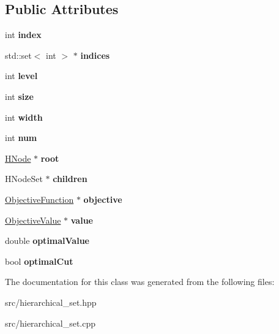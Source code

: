 \subsection*{Public Attributes}
\begin{DoxyCompactItemize}
\item 
\hypertarget{classHNode_a5e2c6cb9918a764753952cdd28617570}{int {\bfseries index}}\label{classHNode_a5e2c6cb9918a764753952cdd28617570}

\item 
\hypertarget{classHNode_a2dc355d3d7502bb90e8682bd81087575}{std\-::set$<$ int $>$ $\ast$ {\bfseries indices}}\label{classHNode_a2dc355d3d7502bb90e8682bd81087575}

\item 
\hypertarget{classHNode_adcc11fe69c64eeb77f920b98e404d9e9}{int {\bfseries level}}\label{classHNode_adcc11fe69c64eeb77f920b98e404d9e9}

\item 
\hypertarget{classHNode_a647c6437fde5eccdfab4879b7c485707}{int {\bfseries size}}\label{classHNode_a647c6437fde5eccdfab4879b7c485707}

\item 
\hypertarget{classHNode_a5bdb5568025a03c7f96cf638821f655d}{int {\bfseries width}}\label{classHNode_a5bdb5568025a03c7f96cf638821f655d}

\item 
\hypertarget{classHNode_a80af2cfac18d728df6f581385fafbb2e}{int {\bfseries num}}\label{classHNode_a80af2cfac18d728df6f581385fafbb2e}

\item 
\hypertarget{classHNode_ad1fc63b85babb8d83f3be87468210e32}{\hyperlink{classHNode}{H\-Node} $\ast$ {\bfseries root}}\label{classHNode_ad1fc63b85babb8d83f3be87468210e32}

\item 
\hypertarget{classHNode_a9138b7f3a2168c03aebc5893364c576f}{H\-Node\-Set $\ast$ {\bfseries children}}\label{classHNode_a9138b7f3a2168c03aebc5893364c576f}

\item 
\hypertarget{classHNode_a7e4827e4c414093a839240472d05f073}{\hyperlink{classObjectiveFunction}{Objective\-Function} $\ast$ {\bfseries objective}}\label{classHNode_a7e4827e4c414093a839240472d05f073}

\item 
\hypertarget{classHNode_aa2362c0c68e9992a9d9c33e7f8523fe0}{\hyperlink{classObjectiveValue}{Objective\-Value} $\ast$ {\bfseries value}}\label{classHNode_aa2362c0c68e9992a9d9c33e7f8523fe0}

\item 
\hypertarget{classHNode_a01f5c59e976223a8561676b427fe4125}{double {\bfseries optimal\-Value}}\label{classHNode_a01f5c59e976223a8561676b427fe4125}

\item 
\hypertarget{classHNode_a08d0d33f51f8d7d96852e9a022af93f3}{bool {\bfseries optimal\-Cut}}\label{classHNode_a08d0d33f51f8d7d96852e9a022af93f3}

\end{DoxyCompactItemize}


The documentation for this class was generated from the following files\-:\begin{DoxyCompactItemize}
\item 
src/hierarchical\-\_\-set.\-hpp\item 
src/hierarchical\-\_\-set.\-cpp\end{DoxyCompactItemize}
